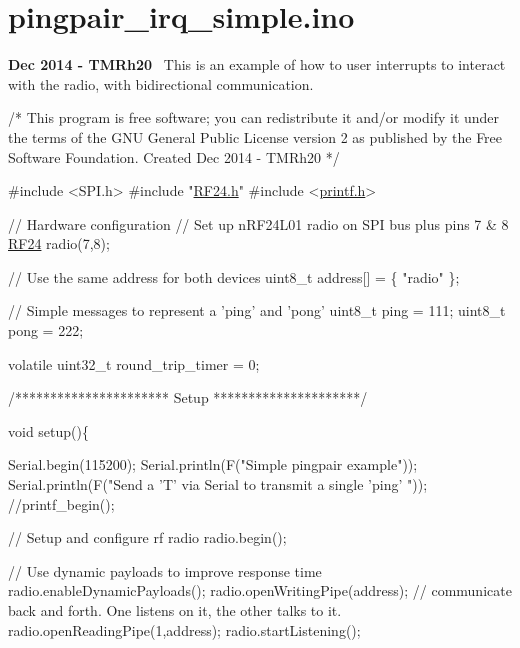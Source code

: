 \hypertarget{pingpair_irq_simple_8ino-example}{}\section{pingpair\+\_\+irq\+\_\+simple.\+ino}
{\bfseries Dec 2014 -\/ T\+M\+Rh20}~\newline
 This is an example of how to user interrupts to interact with the radio, with bidirectional communication.


\begin{DoxyCodeInclude}
\textcolor{comment}{/*}
\textcolor{comment}{ This program is free software; you can redistribute it and/or}
\textcolor{comment}{ modify it under the terms of the GNU General Public License}
\textcolor{comment}{ version 2 as published by the Free Software Foundation.}
\textcolor{comment}{ }
\textcolor{comment}{ Created Dec 2014 - TMRh20}
\textcolor{comment}{ */}

\textcolor{preprocessor}{#include <SPI.h>}
\textcolor{preprocessor}{#include "\hyperlink{RF24_8h}{RF24.h}"}
\textcolor{preprocessor}{#include <\hyperlink{printf_8h}{printf.h}>}

\textcolor{comment}{// Hardware configuration}
\textcolor{comment}{// Set up nRF24L01 radio on SPI bus plus pins 7 & 8}
\hyperlink{classRF24}{RF24} radio(7,8);
                                        
\textcolor{comment}{// Use the same address for both devices}
uint8\_t address[] = \{ \textcolor{stringliteral}{"radio"} \};

\textcolor{comment}{// Simple messages to represent a 'ping' and 'pong'}
uint8\_t ping = 111;
uint8\_t pong = 222;

\textcolor{keyword}{volatile} uint32\_t round\_trip\_timer = 0;


\textcolor{comment}{/********************** Setup *********************/}

\textcolor{keywordtype}{void} setup()\{

  Serial.begin(115200);
  Serial.println(F(\textcolor{stringliteral}{"Simple pingpair example"}));
  Serial.println(F(\textcolor{stringliteral}{"Send a 'T' via Serial to transmit a single 'ping' "}));
  \textcolor{comment}{//printf\_begin();}
  
  \textcolor{comment}{// Setup and configure rf radio}
  radio.begin();

  \textcolor{comment}{// Use dynamic payloads to improve response time}
  radio.enableDynamicPayloads();
  radio.openWritingPipe(address);             \textcolor{comment}{// communicate back and forth.  One listens on it, the other
       talks to it.}
  radio.openReadingPipe(1,address); 
  radio.startListening();
  

\end{DoxyCodeInclude}
